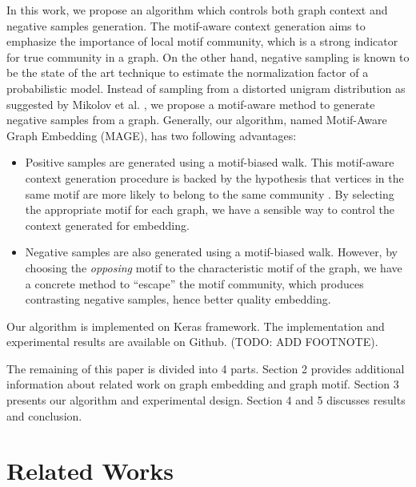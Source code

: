 \documentclass[letterpaper]{article}
\begin{document}
        In this work, we propose an algorithm which controls both graph context and negative samples
        generation. The motif-aware context generation aims to emphasize the importance of local
        motif community, which is a strong indicator for true community in a graph. On the other hand,
        negative sampling is known to be the state of the art technique to estimate the normalization
        factor of a probabilistic model. Instead of sampling from a distorted unigram distribution as
        suggested by Mikolov et al. \cite{skipgram}, we propose a motif-aware method to generate 
        negative samples from a graph. Generally, our algorithm, named Motif-Aware Graph Embedding (MAGE),
        has two following advantages:

        \begin{itemize}
            \setlength{\parskip}{0pt}
            \item Positive samples are generated using a motif-biased walk. This motif-aware context 
                generation procedure is backed by the hypothesis that vertices in the same motif
                are more likely to belong to the same community \cite{juremotif, harvardmotif}.
                By selecting the appropriate motif for each graph, we have a sensible way to control
                the context generated for embedding.
            \item Negative samples are also generated using a motif-biased walk. However, by choosing
                the \emph{opposing} motif to the characteristic motif of the graph, we have a concrete
                method to ``escape'' the motif community, which produces contrasting negative
                samples, hence better quality embedding.
        \end{itemize}

        Our algorithm is implemented on Keras \cite{keras} framework. The implementation and experimental
        results are available on Github. (TODO: ADD FOOTNOTE).

        The remaining of this paper is divided into 4 parts. Section 2 provides additional information
        about related work on graph embedding and graph motif. Section 3 presents our algorithm and
        experimental design. Section 4 and 5 discusses results and conclusion.

    \section{Related Works}
\end{document}
